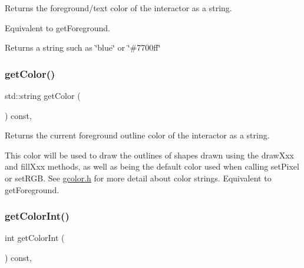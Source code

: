 Returns the foreground/text color of the interactor as a string. 

Equivalent to get\+Foreground. \begin{DoxyReturn}{Returns}
a string such as \char`\"{}blue\char`\"{} or \char`\"{}\#7700ff\char`\"{} 
\end{DoxyReturn}
\mbox{\label{classGDrawingSurface_aa061dfa488c31e18549d64363c1d0e34}} 
\subsubsection{\texorpdfstring{get\+Color()}{getColor()}\hspace{0.1cm}{\footnotesize\ttfamily [2/2]}}
{\footnotesize\ttfamily std\+::string get\+Color (\begin{DoxyParamCaption}{ }\end{DoxyParamCaption}) const\hspace{0.3cm}{\ttfamily [virtual]}, {\ttfamily [inherited]}}



Returns the current foreground outline color of the interactor as a string. 

This color will be used to draw the outlines of shapes drawn using the draw\+Xxx and fill\+Xxx methods, as well as being the default color used when calling set\+Pixel or set\+R\+GB. See \mbox{\hyperlink{gcolor_8h_source}{gcolor.\+h}} for more detail about color strings. Equivalent to get\+Foreground. \mbox{\label{classGInteractor_a9635c7af766cdc3417f346683fa0e6c1}} 
\subsubsection{\texorpdfstring{get\+Color\+Int()}{getColorInt()}\hspace{0.1cm}{\footnotesize\ttfamily [1/2]}}
{\footnotesize\ttfamily int get\+Color\+Int (\begin{DoxyParamCaption}{ }\end{DoxyParamCaption}) const\hspace{0.3cm}{\ttfamily [virtual]}, {\ttfamily [inherited]}}




